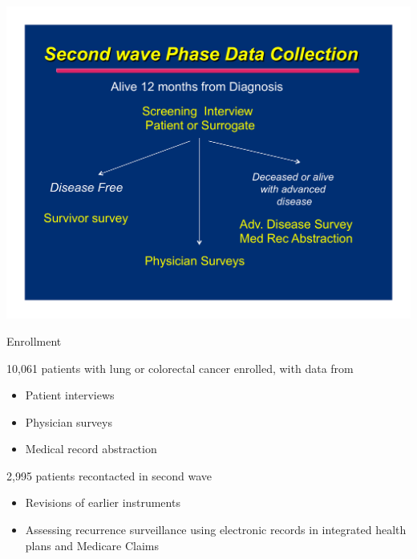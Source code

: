 \documentclass[11pt,handout]{beamer}
\begin{document}
\begin{frame}{}

\begin{center}
\includegraphics[width= 1.0\textwidth]{./figures/second_wave.pdf}
\end{center}

\end{frame}

\begin{frame}{Enrollment}

10,061 patients with lung or colorectal cancer enrolled, with data from	

\begin{itemize}

  \item Patient interviews

  \item Physician surveys

  \item Medical record abstraction

\end{itemize}

  2,995 patients recontacted in second wave
   
  \begin{itemize}
  
   \item Revisions of earlier instruments

   \item Assessing recurrence surveillance using electronic records in
   integrated health plans and Medicare Claims

   \end{itemize}

\end{frame}
\end{document}
